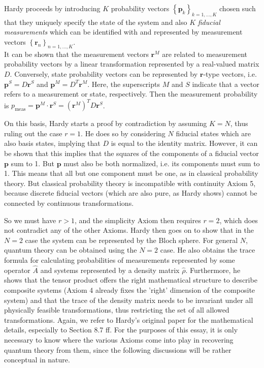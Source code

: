 \documentclass[11pt, a4paper]{article}
\begin{document}
Hardy proceeds by introducing $K$ probability vectors $\left\{\mathbf p_k\right\}_{k=1,\ldots,K}$ chosen such that they uniquely specify the state of the system and also $K$ \emph{fiducial measurements} which can be identified with and represented by measurement vectors $\left\{\mathbf r_n\right\}_{n=1,\ldots,K}$.\\
It can be shown that the measurement vectors $\mathbf r^M$ are related to measurement probability vectors by a linear transformation represented by a real-valued matrix $D$. Conversely, state probability vectors can be represented by $\mathbf r$-type vectors, i.e. $\mathbf p^S=D\mathbf r^S$ and $\mathbf p^M=D^T\mathbf r^M$. Here, the superscripts $M$ and $S$ indicate that a vector refers to a measurement or state, respectively. Then the measurement probability is $p_{\mathrm{meas}}=\mathbf p^M\cdot \mathbf r^S=(\mathbf r^M)^TD\mathbf r^S$.\par
On this basis, Hardy starts a proof by contradiction by assuming $K=N$, thus ruling out the case $r=1$. He does so by considering $N$ fiducial states which are also basis states, implying that $D$ is equal to the identity matrix. However, it can be shown that this implies that the squares of the components of a fiducial vector $\mathbf p$ sum to 1. But $\mathbf p$ must also be both normalized, i.e. its components must sum to 1. This means that all but one component must be one, as in classical probability theory. But classical probability theory is incompatible with continuity Axiom 5, because discrete fiducial vectors (which are also pure, as Hardy shows) cannot be connected by continuous transformations. \par
So we must have $r>1$, and the simplicity Axiom then requires $r=2$, which does not contradict any of the other Axioms. Hardy then goes on to show that in the $N=2$ case the system can be represented by the Bloch sphere. For general $N$, quantum theory can be obtained using the $N=2$ case.  He also obtains the trace formula for calculating probabilities of measurements represented by some operator $\hat A$ and systems represented by a density matrix $\hat\rho$. Furthermore, he shows that the tensor product offers the right mathematical structure to describe composite systems (Axiom 4 already fixes the 'right' dimension of the composite system) and that the trace of the density matrix needs to be invariant under all physically feasible transformations, thus restricting the set of all allowed transformations. Again, we refer to Hardy's original paper for the mathematical details, especially to Section 8.7 ff. For the purposes of this essay, it is only necessary to know where the various Axioms come into play in recovering quantum theory from them, since the following discussions will be rather conceptual in nature.\par
\end{document}

